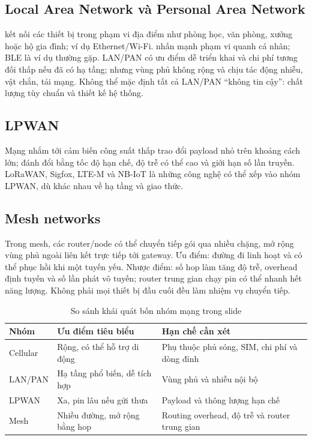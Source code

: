 \subsection{Local Area Network và Personal Area Network}
 kết nối các thiết bị trong phạm vi địa điểm như phòng học, văn phòng, xưởng hoặc hộ gia đình; ví dụ Ethernet/Wi-Fi.  nhấn mạnh phạm vi quanh cá nhân; BLE là ví dụ thường gặp. LAN/PAN có ưu điểm dễ triển khai và chi phí tương đối thấp nếu đã có hạ tầng; nhưng vùng phủ không rộng và chịu tác động nhiễu, vật chắn, tải mạng. Không thể mặc định tất cả LAN/PAN ``không tin cậy'': chất lượng tùy chuẩn và thiết kế hệ thống.
\subsection{LPWAN}
Mạng  nhắm tới cảm biến công suất thấp trao đổi payload nhỏ trên khoảng cách lớn; đánh đổi bằng tốc độ hạn chế, độ trễ có thể cao và giới hạn số lần truyền. LoRaWAN, Sigfox, LTE-M và NB-IoT là những công nghệ có thể xếp vào nhóm LPWAN, dù khác nhau về hạ tầng và giao thức.
\subsection{Mesh networks}
Trong mesh, các router/node có thể chuyển tiếp gói qua nhiều chặng, mở rộng vùng phủ ngoài liên kết trực tiếp tới gateway. Ưu điểm: đường đi linh hoạt và có thể phục hồi khi một tuyến yếu. Nhược điểm: số hop làm tăng độ trễ, overhead định tuyến và số lần phát vô tuyến; router trung gian chạy pin có thể nhanh hết năng lượng. Không phải mọi thiết bị đầu cuối đều làm nhiệm vụ chuyển tiếp.
\begin{table}[htbp]\centering\small\caption{So sánh khái quát bốn nhóm mạng trong slide}
\begin{tabularx}{\textwidth}{@{}p{23mm}X X@{}}\toprule
Nhóm & Ưu điểm tiêu biểu & Hạn chế cần xét\\\midrule
Cellular & Rộng, có thể hỗ trợ di động & Phụ thuộc phủ sóng, SIM, chi phí và dòng đỉnh\\
LAN/PAN & Hạ tầng phổ biến, dễ tích hợp & Vùng phủ và nhiễu nội bộ\\
LPWAN & Xa, pin lâu nếu gửi thưa & Payload và thông lượng hạn chế\\
Mesh & Nhiều đường, mở rộng bằng hop & Routing overhead, độ trễ và router trung gian\\\bottomrule
\end{tabularx}
\end{table}
